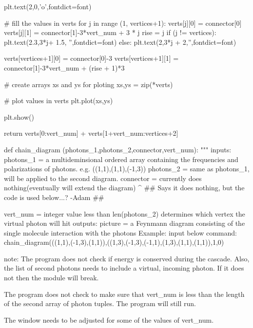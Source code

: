 \documentclass[11pt,a4paper,notitlepage]{article}
\begin{document}
\begin{code}
    plt.text(2,0,'o',fontdict=font)
    
    # fill the values in verts
    for j in range (1, vertices+1):
        verts[j][0] = connector[0]
        verts[j][1] = connector[1]-3*vert_num + 3 * j
        rise = j  
        if (j != vertices):  
            plt.text(2.3,3*j+ 1.5, '',fontdict=font)
        else:
            plt.text(2,3*j + 2,'',fontdict=font)
            
    verts[vertices+1][0] = connector[0]-3
    verts[vertices+1][1] = connector[1]-3*vert_num + (rise + 1)*3
       
    # create arrays xs and ys for ploting    
    xs,ys = zip(*verts)
    
    # plot values in verts
    plt.plot(xs,ys)
    
    plt.show()
    
    return verts[0:vert_num] + verts[1+vert_num:vertices+2]

def chain_diagram (photons_1,photons_2,connector,vert_num):
    """
    inputs:
        photons_1 = a multideminsional ordered array containing the frequencies and 
            polarizations of photons. e.g. ((1,1),(1,1),(-1,3))
        photons_2 = same as photons_1, will be applied to the second 
            diagram.  
        connector = currently does nothing(eventually will extend the diagram)
        ^ ## Says it does nothing, but the code is used below...? -Adam ##
        
        vert_num = integer value less than len(photons_2)
            determines which vertex the virtual photon will hit 
    outputs:
        picture = a Feynmann diagram consisting of the single molecule 
            interaction with the photons
    Example:
        input below command:
            chain_diagram(((1,1),(-1,3),(1,1)),((1,3),(-1,3),(-1,1),(1,3),(1,1),(1,1)),1,0)
            
            note: The program does not check if energy is conserved during the 
                  cascade.  Also, the list of second photons needs to include
                  a virtual, incoming photon.  If it does not then the module 
                  will break.
                  
                  The program does not check to make sure that vert_num is 
                  less than the length of the second array of photon tuples.
                  The program will still run.
                  
                  The window needs to be adjusted for some of the values of
                  vert_num.
                  

\end{code}
\end{document}
